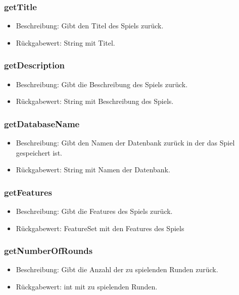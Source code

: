 \documentclass[a4paper]{scrreprt}
\begin{document}
	\subsubsection{getTitle}
	\begin{itemize}
		\item Beschreibung: Gibt den Titel des Spiels zurück.
		\item Rückgabewert: String mit Titel.
	\end{itemize}

	\subsubsection{getDescription}
	\begin{itemize}
		\item Beschreibung: Gibt die Beschreibung des Spiels zurück.
		\item Rückgabewert: String mit Beschreibung des Spiels.
	\end{itemize}

	\subsubsection{getDatabaseName}
	\begin{itemize}
		\item Beschreibung: Gibt den Namen der Datenbank zurück in der das Spiel gespeichert ist.
		\item Rückgabewert: String mit Namen der Datenbank.
	\end{itemize}

	\subsubsection{getFeatures}
	\begin{itemize}
		\item Beschreibung: Gibt die Features des Spiels zurück.
		\item Rückgabewert: FeatureSet mit den Features des Spiels
	\end{itemize}

	\subsubsection{getNumberOfRounds}
	\begin{itemize}
		\item Beschreibung: Gibt die Anzahl der zu spielenden Runden zurück.
		\item Rückgabewert: int mit zu spielenden Runden.
	\end{itemize}
\end{document}
